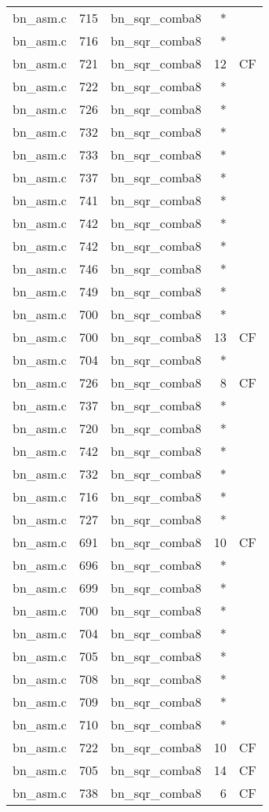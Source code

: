 \begin{table*}
\begin{tabular}{clrrr}
bn\_asm.c&715&bn\_sqr\_comba8&*&\\
bn\_asm.c&716&bn\_sqr\_comba8&*&\\
bn\_asm.c&721&bn\_sqr\_comba8&12&CF\\
bn\_asm.c&722&bn\_sqr\_comba8&*&\\
bn\_asm.c&726&bn\_sqr\_comba8&*&\\
bn\_asm.c&732&bn\_sqr\_comba8&*&\\
bn\_asm.c&733&bn\_sqr\_comba8&*&\\
bn\_asm.c&737&bn\_sqr\_comba8&*&\\
bn\_asm.c&741&bn\_sqr\_comba8&*&\\
bn\_asm.c&742&bn\_sqr\_comba8&*&\\
bn\_asm.c&742&bn\_sqr\_comba8&*&\\
bn\_asm.c&746&bn\_sqr\_comba8&*&\\
bn\_asm.c&749&bn\_sqr\_comba8&*&\\
bn\_asm.c&700&bn\_sqr\_comba8&*&\\
bn\_asm.c&700&bn\_sqr\_comba8&13&CF\\
bn\_asm.c&704&bn\_sqr\_comba8&*&\\
bn\_asm.c&726&bn\_sqr\_comba8&8 &CF\\
bn\_asm.c&737&bn\_sqr\_comba8&*&\\
bn\_asm.c&720&bn\_sqr\_comba8&*&\\
bn\_asm.c&742&bn\_sqr\_comba8&*&\\
bn\_asm.c&732&bn\_sqr\_comba8&*&\\
bn\_asm.c&716&bn\_sqr\_comba8&*&\\
bn\_asm.c&727&bn\_sqr\_comba8&*&\\
bn\_asm.c&691&bn\_sqr\_comba8&10&CF\\
bn\_asm.c&696&bn\_sqr\_comba8&*&\\
bn\_asm.c&699&bn\_sqr\_comba8&*&\\
bn\_asm.c&700&bn\_sqr\_comba8&*&\\
bn\_asm.c&704&bn\_sqr\_comba8&*&\\
bn\_asm.c&705&bn\_sqr\_comba8&*&\\
bn\_asm.c&708&bn\_sqr\_comba8&*&\\
bn\_asm.c&709&bn\_sqr\_comba8&*&\\
bn\_asm.c&710&bn\_sqr\_comba8&*&\\
bn\_asm.c&722&bn\_sqr\_comba8&10&CF\\
bn\_asm.c&705&bn\_sqr\_comba8&14&CF\\
bn\_asm.c&738&bn\_sqr\_comba8&6 &CF\\

\end{tabular}
\end{table*}
